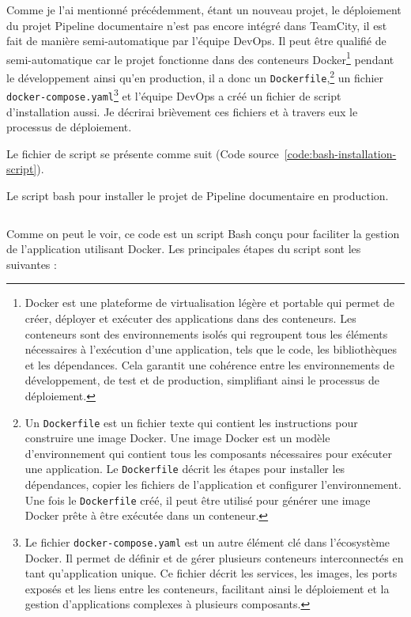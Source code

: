 Comme je l'ai mentionné précédemment, étant un nouveau projet, le déploiement du projet Pipeline documentaire n'est pas encore intégré dans TeamCity, il est fait de manière semi-automatique par l'équipe DevOps. Il peut être qualifié de semi-automatique car le projet fonctionne dans des conteneurs Docker\footnote{Docker est une plateforme de virtualisation légère et portable qui permet de créer, déployer et exécuter des applications dans des conteneurs. Les conteneurs sont des environnements isolés qui regroupent tous les éléments nécessaires à l'exécution d'une application, tels que le code, les bibliothèques et les dépendances. Cela garantit une cohérence entre les environnements de développement, de test et de production, simplifiant ainsi le processus de déploiement.} pendant le développement ainsi qu'en production, il a donc un \Verb|Dockerfile|,\cprotect\footnote{Un \Verb|Dockerfile| est un fichier texte qui contient les instructions pour construire une image Docker. Une image Docker est un modèle d'environnement qui contient tous les composants nécessaires pour exécuter une application. Le \Verb|Dockerfile| décrit les étapes pour installer les dépendances, copier les fichiers de l'application et configurer l'environnement. Une fois le \Verb|Dockerfile| créé, il peut être utilisé pour générer une image Docker prête à être exécutée dans un conteneur.} un fichier \Verb|docker-compose.yaml|\cprotect\footnote{Le fichier \Verb|docker-compose.yaml| est un autre élément clé dans l'écosystème Docker. Il permet de définir et de gérer plusieurs conteneurs interconnectés en tant qu'application unique. Ce fichier décrit les services, les images, les ports exposés et les liens entre les conteneurs, facilitant ainsi le déploiement et la gestion d'applications complexes à plusieurs composants.} et l'équipe DevOps a créé un fichier de script d'installation aussi. Je décrirai brièvement ces fichiers et à travers eux le processus de déploiement.

Le fichier de script se présente comme suit (Code source~\ref{code:bash-installation-script}).

\begin{code}
    \caption{Le script bash pour installer le projet de Pipeline documentaire en production.}
    \inputminted{bash}{code/cicd.sh}
    \label{code:bash-installation-script}
\end{code}

Comme on peut le voir, ce code est un script Bash conçu pour faciliter la gestion de l'application utilisant Docker. Les principales étapes du script sont les suivantes :

